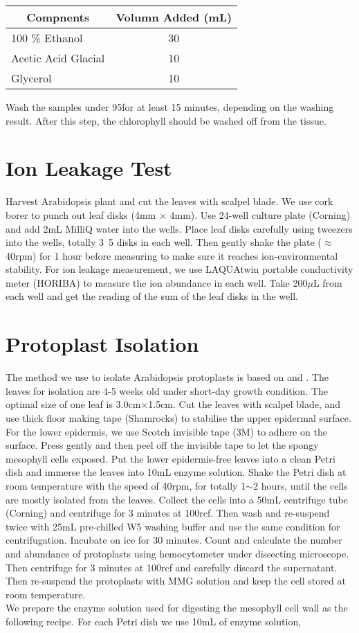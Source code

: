 \begin{tabular}[h]{l c}
	\hline
	\multicolumn{1}{c}{\textsf{\textbf{Compnents}}} & \textsf{\textbf{Volumn Added (mL)}} \\
	\hline
	100 \% Ethanol & 30 \\
	Acetic Acid Glacial & 10 \\
	Glycerol & 10 \\
	\hline
\end{tabular}
\linebreak
\linebreak
Wash the samples under 95\textcelsius for at least 15 minutes, depending on the washing result. After this step, the chlorophyll should be washed off from the tissue.\\
\section{Ion Leakage Test}
Harvest Arabidopsis plant and cut the leaves with scalpel blade. We use cork borer to punch out leaf disks (4mm $\times$ 4mm). Use 24-well culture plate (Corning) and add 2mL MilliQ water into the wells. Place leaf disks carefully using tweezers into the wells, totally 3~5 disks in each well. Then gently shake the plate ($\approx$40rpm) for 1 hour before measuring to make sure it reaches ion-environmental stability. For ion leakage measurement, we use LAQUAtwin portable conductivity meter (HORIBA) to measure the ion abundance in each well. Take 200$\mu$L from each well and get the reading of the sum of the leaf disks in the well.
\section{Protoplast Isolation}
The method we use to isolate Arabidopsis protoplasts is based on \citet{wu2009tape} and \citet{yoo2007arabidopsis}. The leaves for isolation are 4-5 weeks old under short-day growth condition. The optimal size of one leaf is 3.0cm$\times$1.5cm. Cut the leaves with scalpel blade, and use thick floor making tape (Shamrocks) to stabilise the upper epidermal surface. For the lower epidermis, we use Scotch invisible tape (3M) to adhere on the surface. Press gently and then peel off the invisible tape to let the spongy mesophyll cells exposed. Put the lower epidermis-free leaves into a clean Petri dish and immerse the leaves into 10mL enzyme solution. Shake the Petri dish at room temperature with the speed of 40rpm, for totally 1$\sim$2 hours, until the cells are mostly isolated from the leaves. Collect the cells into a 50mL centrifuge tube (Corning) and centrifuge for 3 minutes at 100rcf. Then wash and re-suspend twice with 25mL pre-chilled W5 washing buffer and use the same condition for centrifugation. Incubate on ice for 30 minutes. Count and calculate the number and abundance of protoplasts using hemocytometer under dissecting microscope. Then centrifuge for 3 minutes at 100rcf and carefully discard the supernatant. Then re-suspend the protoplasts with MMG solution and keep the cell stored at room temperature.\\
We prepare the enzyme solution used for digesting the mesophyll cell wall as the following recipe. For each Petri dish we use 10mL of enzyme solution, \\

